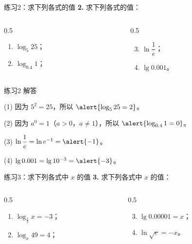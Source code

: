 \documentclass[10pt,aspectratio=169,serif]{beamer}
\begin{document}
\begin{frame}[t]{练习2：求下列各式的值}
\textbf{2.} 求下列各式的值：

\vspace{0.5em}
\begin{columns}[t]
\begin{column}{0.5\textwidth}
\begin{enumerate}
  \item $\log_5 25$；
  \item $\log_{0.4} 1$；
\end{enumerate}
\end{column}
\begin{column}{0.5\textwidth}
\begin{enumerate}\setcounter{enumi}{2}
  \item $\ln \dfrac{1}{e}$；
  \item $\lg 0.001$。
\end{enumerate}
\end{column}
\end{columns}
\end{frame}

\begin{frame}[t]{练习2 解答}
\begin{tcolorbox}[colback=orange!10,colframe=orange,title=\textbf{解}]
(1) 因为 $5^2 = 25$，所以 $\alert{\log_5 25 = 2}$。

\vspace{0.3em}
(2) 因为 $a^0 = 1$（$a>0$，$a\neq 1$），所以 $\alert{\log_{0.4} 1 = 0}$。

\vspace{0.3em}
(3) $\ln\dfrac{1}{e} = \ln e^{-1} = \alert{-1}$。

\vspace{0.3em}
(4) $\lg 0.001 = \lg 10^{-3} = \alert{-3}$。
\end{tcolorbox}
\end{frame}

\begin{frame}[t]{练习3：求下列各式中 $x$ 的值}
\textbf{3.} 求下列各式中 $x$ 的值：

\vspace{0.5em}
\begin{columns}[t]
\begin{column}{0.5\textwidth}
\begin{enumerate}
  \item $\log_{\frac{1}{3}} x = -3$；
  \item $\log_x 49 = 4$；
\end{enumerate}
\end{column}
\begin{column}{0.5\textwidth}
\begin{enumerate}\setcounter{enumi}{2}
  \item $\lg 0.00001 = x$；
  \item $\ln\sqrt{e} = -x$。
\end{enumerate}
\end{column}
\end{columns}
\end{frame}
\end{document}
